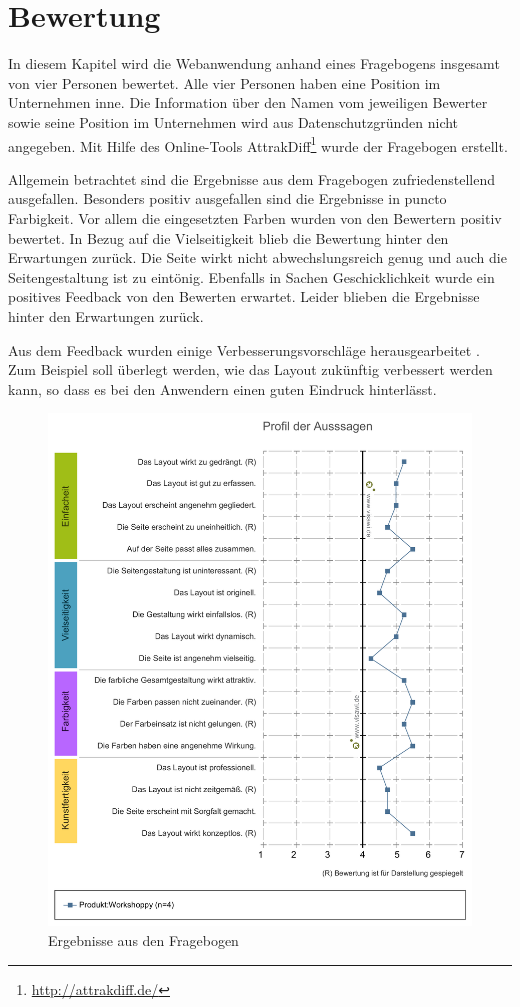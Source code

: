 \chapter{Bewertung}
\label{sec:bewertung}
In diesem Kapitel wird die Webanwendung anhand eines Fragebogens insgesamt von vier Personen bewertet. Alle vier Personen haben eine Position im Unternehmen inne. Die Information über den Namen vom jeweiligen Bewerter sowie seine Position im Unternehmen wird aus Datenschutzgründen nicht angegeben. Mit Hilfe des Online-Tools AttrakDiff\footnote{\url{http://attrakdiff.de/}} wurde der Fragebogen erstellt.\bigskip

Allgemein betrachtet sind die Ergebnisse aus dem Fragebogen zufriedenstellend ausgefallen. Besonders positiv ausgefallen sind die Ergebnisse in puncto Farbigkeit. Vor allem die eingesetzten Farben wurden von den Bewertern positiv bewertet. In Bezug auf die Vielseitigkeit blieb die Bewertung hinter den Erwartungen zurück. Die Seite wirkt nicht abwechslungsreich genug und auch die Seitengestaltung ist zu eintönig. Ebenfalls in Sachen Geschicklichkeit wurde ein positives Feedback von den Bewerten erwartet. Leider blieben die Ergebnisse hinter den Erwartungen zurück.\bigskip

Aus dem Feedback wurden einige Verbesserungsvorschläge herausgearbeitet . Zum Beispiel soll überlegt werden, wie das Layout zukünftig verbessert werden kann, so dass es bei den Anwendern einen guten Eindruck hinterlässt.

\begin{figure}[H]
  \begin{center}
    \includegraphics[scale=0.3]{img/das_Profil_der_Aussagen}
	\caption{Ergebnisse aus den Fragebogen} 
	\label{fig:profil der Aussagen}
  \end{center}   
\end{figure}

